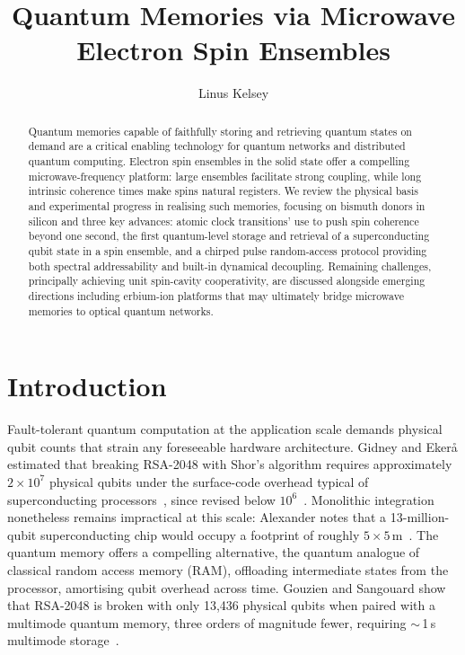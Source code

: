 \documentclass[technote]{IEEEtran}
\title{Quantum Memories via Microwave Electron Spin Ensembles}
\author{Linus Kelsey}
\begin{document}
\maketitle

\begin{abstract}
Quantum memories capable of faithfully storing and retrieving quantum states on demand are a critical enabling technology for quantum networks and distributed quantum computing. Electron spin ensembles in the solid state offer a compelling microwave-frequency platform: large ensembles facilitate strong coupling, while long intrinsic coherence times make spins natural registers. We review the physical basis and experimental progress in realising such memories, focusing on bismuth donors in silicon and three key advances: atomic clock transitions' use to push spin coherence beyond one second, the first quantum-level storage and retrieval of a superconducting qubit state in a spin ensemble, and a chirped pulse random-access protocol providing both spectral addressability and built-in dynamical decoupling. Remaining challenges, principally achieving unit spin-cavity cooperativity, are discussed alongside emerging directions including erbium-ion platforms that may ultimately bridge microwave memories to optical quantum networks.
\end{abstract}

\section{Introduction}

Fault-tolerant quantum computation at the application scale demands physical qubit counts that strain any foreseeable hardware architecture. Gidney and Eker{\aa} estimated that breaking RSA-2048 with Shor's algorithm requires approximately $2\times10^{7}$ physical qubits under the surface-code overhead typical of superconducting processors~\cite{gidney2021}, since revised below $10^6$~\cite{gidney2025}. Monolithic integration nonetheless remains impractical at this scale: Alexander notes that a 13-million-qubit superconducting chip would occupy a footprint of roughly $5\times5$\,m~\cite{alexander_thesis}. The quantum memory offers a compelling alternative, the quantum analogue of classical random access memory (RAM), offloading intermediate states from the processor, amortising qubit overhead across time. Gouzien and Sangouard show that RSA-2048 is broken with only 13,436 physical qubits when paired with a multimode quantum memory, three orders of magnitude fewer, requiring $\sim$\,1\,s multimode storage~\cite{gouzien2021}.
\end{document}
